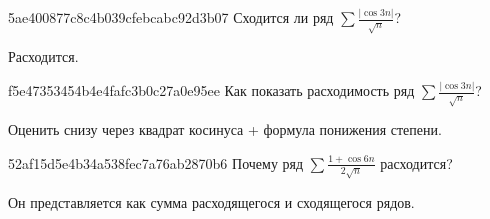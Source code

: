 \begin{note}{5ae400877c8c4b039cfebcabc92d3b07}
    Сходится ли ряд \({ \sum \frac{\left\lvert \cos 3n \right\rvert}{\sqrt{n}} }\)?

    \begin{cloze}{1}
        Расходится.
    \end{cloze}
\end{note}

\begin{note}{f5e47353454b4e4fafc3b0c27a0e95ee}
    Как показать расходимость ряд \({ \sum \frac{\left\lvert \cos 3n \right\rvert}{\sqrt{n}} }\)?

    \begin{cloze}{1}
        Оценить снизу через квадрат косинуса + формула понижения степени.
    \end{cloze}
\end{note}

\begin{note}{52af15d5e4b34a538fec7a76ab2870b6}
    Почему ряд \({ \sum \frac{1 + \cos 6n}{2 \sqrt{n}} }\) расходится?

    \begin{cloze}{1}
        Он представляется как сумма расходящегося и сходящегося рядов.
    \end{cloze}
\end{note}


